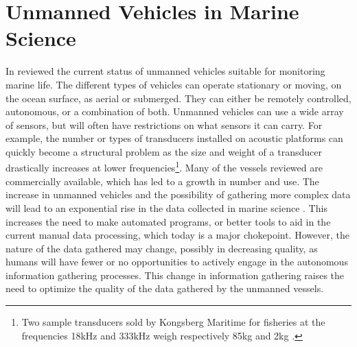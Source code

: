     
\section{Unmanned Vehicles in Marine Science} \label{Unmanned Vehicles in Marine Science}
        In \citeyear{VERFUSS201917} \citeauthor{VERFUSS201917} \cite{VERFUSS201917} reviewed the current status of unmanned vehicles suitable for monitoring marine life. The different types of vehicles can operate stationary or moving, on the ocean surface, as aerial or submerged.  They can either be remotely controlled, autonomous, or a combination of both. Unmanned vehicles can use a wide array of sensors, but will often have restrictions on what sensors it can carry. For example, the number or types of transducers installed on acoustic platforms can quickly become a structural problem as the size and weight of a transducer drastically increases at lower frequencies\footnote{Two sample transducers sold by Kongsberg Maritime for fisheries at the frequencies 18kHz and 333kHz weigh respectively 85kg and 2kg \cite{kongsberg_transducers}.}. Many of the vessels reviewed are commercially available, which has led to a growth in number and use.  The increase in unmanned vehicles and the possibility of gathering more complex data will lead to an exponential rise in the data collected in marine science \cite{malde2020machine}. This increases the need to make automated programs, or better tools to aid in the current manual data processing, which today is a major chokepoint. However, the nature of the data gathered may change, possibly in decreasing quality, as humans will have fewer or no opportunities to actively engage in the autonomous information gathering processes. This change in information gathering raises the need to optimize the quality of the data gathered by the unmanned vessels.%

